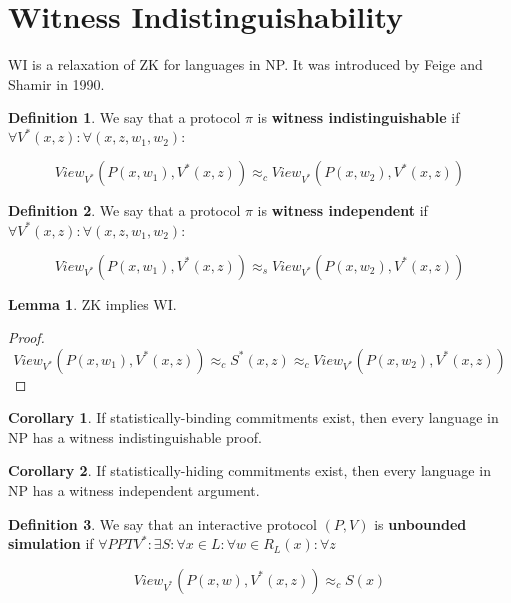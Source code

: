 \documentclass{article}
\theoremstyle{definition}
\newtheorem{definition}{Definition}
\newtheorem{lemma}[theorem]{Lemma}
\newtheorem{corollary}{Corollary}[theorem]
\begin{document}
\newpage

\section{Witness Indistinguishability}

WI is a relaxation of ZK for languages in NP. It was introduced by Feige and Shamir in 1990.

\begin{definition}
    We say that a protocol $\pi$ is \textbf{witness indistinguishable} if 
    $\forall V^{*}(x,z): \forall (x,z,w_{1},w_{2}):$

    \[ View_{V^{*}}(P(x,w_{1}), V^{*}(x,z)) \approx_{c} View_{V^{*}}(P(x,w_{2}), V^{*}(x,z)) \]
\end{definition}

\begin{definition}
    We say that a protocol $\pi$ is \textbf{witness independent} if 
    $\forall V^{*}(x,z): \forall (x,z,w_{1},w_{2}):$

    \[ View_{V^{*}}(P(x,w_{1}), V^{*}(x,z)) \approx_{s} View_{V^{*}}(P(x,w_{2}), V^{*}(x,z)) \]
\end{definition}

\begin{lemma}
    ZK implies WI.
\end{lemma}
\begin{proof}
    \[ View_{V^{*}}(P(x,w_{1}), V^{*}(x,z)) \approx_{c} S^{*}(x,z) \approx_{c} View_{V^{*}}(P(x,w_{2}), V^{*}(x,z)) \]
\end{proof}

\begin{corollary}
    If statistically-binding commitments exist, then every language in NP has a witness
    indistinguishable proof.
\end{corollary}

\begin{corollary}
    If statistically-hiding commitments exist, then every language in NP has a witness
    independent argument.
\end{corollary}

\begin{definition}
    We say that an interactive protocol $(P,V)$ is \textbf{unbounded simulation} 
    if $\forall PPT V^{*}: \exists S: \forall x \in L: \forall w \in R_{L}(x):\forall z$

    \[ View_{V^{*}}(P(x,w), V^{*}(x,z)) \approx_{c} S(x) \]
\end{definition}
\end{document}
